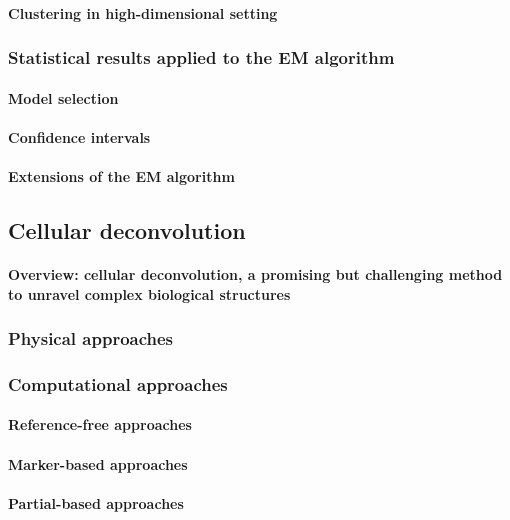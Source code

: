 \paragraph{Clustering in high-dimensional setting}

\subsubsection{Statistical results applied to the EM algorithm}

\paragraph{Model selection}
\paragraph{Confidence intervals}
\paragraph{Extensions of the EM algorithm}



\subsection{Cellular deconvolution}
\paragraph{Overview: cellular deconvolution, a promising but challenging method to unravel complex biological structures}

\subsubsection{Physical approaches}

\subsubsection{Computational approaches}

\paragraph{Reference-free approaches}

\paragraph{Marker-based approaches}

\paragraph{Partial-based approaches}



